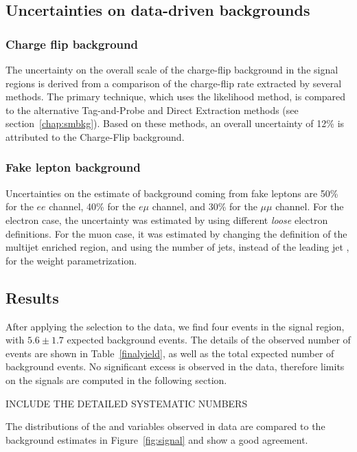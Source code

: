 \subsection{Uncertainties on data-driven backgrounds}

\subsubsection{Charge flip background}
 The uncertainty on the overall scale of the charge-flip background in the signal regions is derived from a comparison of the charge-flip rate extracted by several methods.
The primary technique, which uses the likelihood method, is compared to the alternative Tag-and-Probe and Direct Extraction methods (see section~\ref{chap:smbkg}).
Based on these methods, an overall uncertainty of 12\% is attributed to the Charge-Flip background.

\subsubsection{Fake lepton background}

Uncertainties on the estimate of background coming from fake leptons are 50\% for the $ee$ channel, 40\% for the $e\mu$ channel, and 30\% for the $\mu\mu$ channel.
For the electron case, the uncertainty was estimated by using different {\it loose} electron definitions. For the muon case, it was estimated by changing the definition of the multijet enriched region, and using the number of jets, instead of the leading jet \pT{}, for the weight parametrization.











\subsection{Results}\label{sect:results}
After applying the selection to the data, we find four events in the signal region, with $5.6\pm1.7$ expected background events. 
The details of the observed number of events are shown in Table~\ref{finalyield}, as well as the total expected number of background events. 
No significant excess is observed in the data, therefore limits on the signals are computed in the following section.

INCLUDE THE DETAILED SYSTEMATIC NUMBERS

The distributions of the \met{} and \HT{} variables observed in data are compared to the background estimates in Figure~\ref{fig:signal} and show a good agreement.

